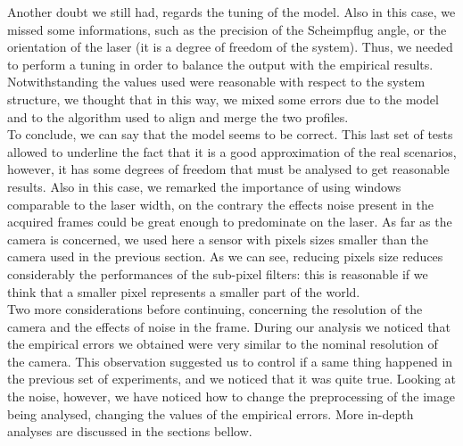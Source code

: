 Another doubt we still had, regards the tuning of the model. Also in this case, we missed some informations, such as the precision of the Scheimpflug angle, or the orientation of the laser (it is a degree of freedom of the system). Thus, we needed to perform a tuning in order to balance the output with the empirical results. Notwithstanding the values used were reasonable with respect to the system structure, we thought that in this way, we mixed some errors due to the model and to the algorithm used to align and merge the two profiles. \\

To conclude, we can say that the model seems to be correct. This last set of tests allowed to underline the fact that it is a good approximation of the real scenarios, however, it has some degrees of freedom that must be analysed to get reasonable results. Also in this case, we remarked the importance of using windows comparable to the laser width, on the contrary the effects noise present in the acquired frames could be great enough to predominate on the laser. As far as the camera is concerned, we used here a sensor with pixels sizes smaller than the camera used in the previous section. As we can see, reducing pixels size reduces considerably the performances of the sub-pixel filters: this is reasonable if we think that a smaller pixel represents a smaller part of the world. \\
Two more considerations before continuing, concerning the resolution of the camera and the effects of noise in the frame. During our analysis we noticed that the empirical errors we obtained were very similar to the nominal resolution of the camera. This observation suggested us to control if a same thing happened in the previous set of experiments, and we noticed that it was quite true. Looking at the noise, however, we have noticed how to change the preprocessing of the image being analysed, changing the values of the empirical errors. More in-depth analyses are discussed in the sections bellow.
%